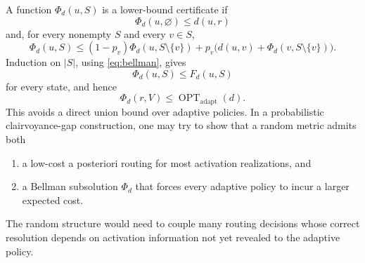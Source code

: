 \documentclass[11pt]{article}
\theoremstyle{remark}
\newcommand{\optadapt}{\operatorname{OPT}_{\mathrm{adapt}}}
\begin{document}
A function $\Phi_d(u,S)$ is a lower-bound certificate if
\[
    \Phi_d(u,\varnothing)\leq d(u,r)
\]
and, for every nonempty $S$ and every $v\in S$,
\begin{equation}\label{eq:subsolution}
    \Phi_d(u,S)
    \leq
    (1-p_v)\Phi_d(u,S\setminus\{v\})
    +p_v\bigl(d(u,v)+\Phi_d(v,S\setminus\{v\})\bigr).
\end{equation}
Induction on $|S|$, using \eqref{eq:bellman}, gives
\[
    \Phi_d(u,S)\leq F_d(u,S)
\]
for every state, and hence
\[
    \Phi_d(r,V)\leq\optadapt(d).
\]
This avoids a direct union bound over adaptive policies.  In a probabilistic
clairvoyance-gap construction, one may try to show that a random metric admits
both
\begin{enumerate}
    \item a low-cost a posteriori routing for most activation realizations, and
    \item a Bellman subsolution $\Phi_d$ that forces every adaptive policy to
    incur a larger expected cost.
\end{enumerate}
The random structure would need to couple many routing decisions whose correct
resolution depends on activation information not yet revealed to the adaptive
policy.
\end{document}
